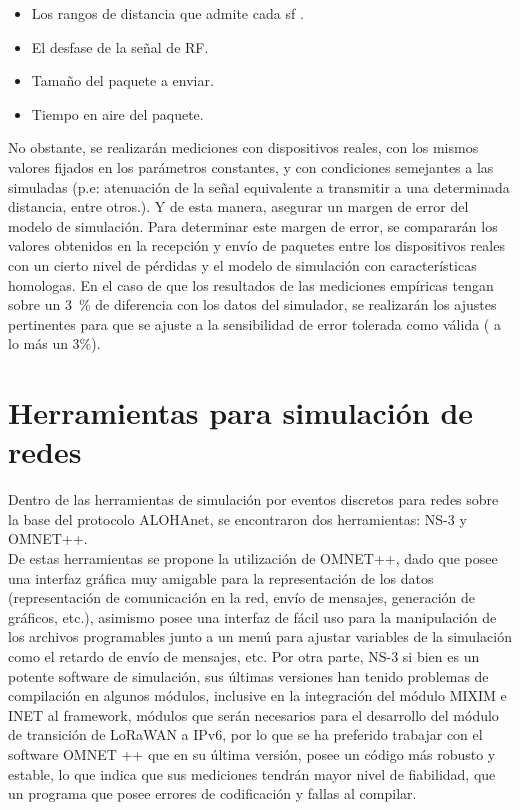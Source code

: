\begin{justify}
\begin{itemize}
\item Los rangos de distancia que admite cada \gls{sf} .
\item El desfase de la señal de RF.
\item Tamaño del paquete a enviar.
\item Tiempo en aire del paquete.
\end{itemize}
No obstante, se realizarán mediciones con dispositivos reales, con los mismos valores fijados en los parámetros constantes, y con condiciones semejantes a las simuladas (p.e: atenuación de la señal equivalente a transmitir a una determinada distancia, entre otros.). Y de esta manera, asegurar un margen de error del modelo de simulación. Para determinar este margen de error, se compararán los valores obtenidos en la recepción y envío de paquetes entre los dispositivos reales con un cierto nivel de pérdidas y el modelo de simulación con características homologas.  En el caso de que los resultados de las mediciones empíricas tengan sobre un \SI{3}{\percent} de diferencia con los datos del simulador, se realizarán los ajustes pertinentes para que se ajuste a la sensibilidad de error tolerada como válida ( a lo más un 3\%).
\section{Herramientas para simulación de redes}
Dentro de las herramientas de simulación por eventos discretos para redes sobre la base del protocolo ALOHAnet, se encontraron dos herramientas: NS-3 y OMNET++.\\
De estas herramientas se propone la utilización de OMNET++, dado que posee una interfaz gráfica muy amigable para la representación de los datos (representación de comunicación en la red, envío de mensajes, generación de gráficos, etc.), asimismo posee una interfaz de fácil uso para la manipulación de los archivos programables junto a un menú para ajustar variables de la simulación como el retardo de envío de mensajes, etc. Por otra parte, NS-3 si bien es un potente software de simulación, sus últimas versiones han tenido problemas de compilación en algunos módulos, inclusive en la integración del módulo MIXIM e INET al framework, módulos que serán necesarios para el desarrollo del módulo de transición de LoRaWAN a IPv6, por lo que se ha preferido trabajar con el software OMNET ++ que en su última versión, posee un código más robusto y estable, lo que indica que sus mediciones tendrán mayor nivel de fiabilidad, que un programa que posee errores de codificación y fallas al compilar.

\end{justify}